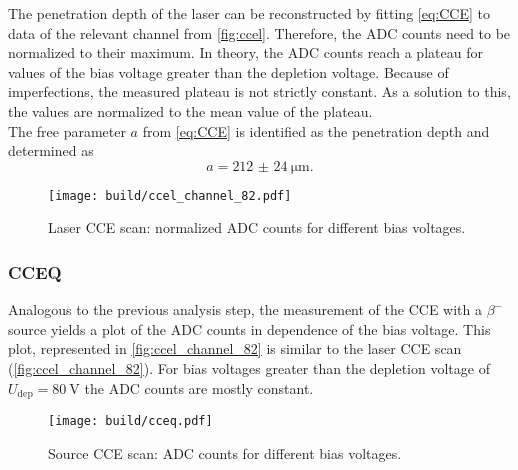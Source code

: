 The penetration depth of the laser can be reconstructed by fitting \autoref{eq:CCE} to data of the relevant channel from \autoref{fig:ccel}.
Therefore, the ADC counts need to be normalized to their maximum. In theory, the ADC counts reach a plateau for values of the bias voltage greater 
than the depletion voltage. Because of imperfections, the measured plateau is not strictly constant. As a solution to this, the values are normalized to the
mean value of the plateau. \\
The free parameter $a$ from \autoref{eq:CCE} is identified as the penetration depth and determined as
\begin{equation*}
    a = \qty{212(24)}{\micro\metre}.
\end{equation*}

\begin{figure}
    \centering
    \texttt{[image: build/ccel\_channel\_82.pdf]}
    \caption{Laser CCE scan: normalized ADC counts for different bias voltages.}
    \label{fig:ccel_channel_82}
\end{figure}

\subsubsection{CCEQ}
Analogous to the previous analysis step, the measurement of the CCE with a $\beta^-$ source yields a plot of the ADC counts in dependence of the bias voltage.
This plot, represented in \autoref{fig:ccel_channel_82} is similar to the laser CCE scan (\autoref{fig:ccel_channel_82}). For bias voltages greater than
the depletion voltage of $U_\mathrm{dep} = \qty{80}{\volt}$ the ADC counts are mostly constant.
\begin{figure}
    \centering
    \texttt{[image: build/cceq.pdf]}
    \caption{Source CCE scan: ADC counts for different bias voltages.}
    \label{fig:cceq}
\end{figure}

